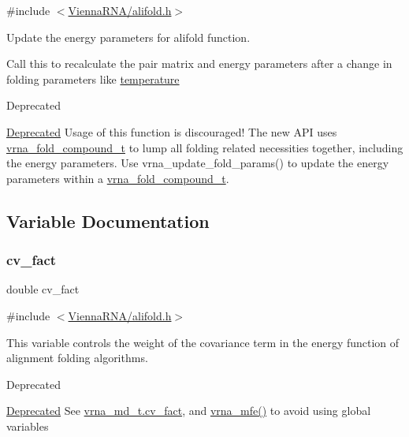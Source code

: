 {\ttfamily \#include $<$\hyperlink{alifold_8h}{Vienna\+R\+N\+A/alifold.\+h}$>$}



Update the energy parameters for alifold function. 

Call this to recalculate the pair matrix and energy parameters after a change in folding parameters like \hyperlink{group__model__details_gab4b11c8d9c758430960896bc3fe82ead}{temperature}

\begin{DoxyRefDesc}{Deprecated}
\item[\hyperlink{deprecated__deprecated000025}{Deprecated}]Usage of this function is discouraged! The new A\+PI uses \hyperlink{group__fold__compound_ga1b0cef17fd40466cef5968eaeeff6166}{vrna\+\_\+fold\+\_\+compound\+\_\+t} to lump all folding related necessities together, including the energy parameters. Use vrna\+\_\+update\+\_\+fold\+\_\+params() to update the energy parameters within a \hyperlink{group__fold__compound_ga1b0cef17fd40466cef5968eaeeff6166}{vrna\+\_\+fold\+\_\+compound\+\_\+t}. \end{DoxyRefDesc}


\subsection{Variable Documentation}
\mbox{\label{group__consensus__fold_gaf3cbac6ff5d706d6e414677841ddf94c}} 
\subsubsection{\texorpdfstring{cv\+\_\+fact}{cv\_fact}}
{\footnotesize\ttfamily double cv\+\_\+fact}



{\ttfamily \#include $<$\hyperlink{alifold_8h}{Vienna\+R\+N\+A/alifold.\+h}$>$}



This variable controls the weight of the covariance term in the energy function of alignment folding algorithms. 

\begin{DoxyRefDesc}{Deprecated}
\item[\hyperlink{deprecated__deprecated000016}{Deprecated}]See \hyperlink{group__model__details_a62ebefb9d0643e5c4c8a2ec84a105ce6}{vrna\+\_\+md\+\_\+t.\+cv\+\_\+fact}, and \hyperlink{group__mfe__fold_gabd3b147371ccf25c577f88bbbaf159fd}{vrna\+\_\+mfe()} to avoid using global variables\end{DoxyRefDesc}



